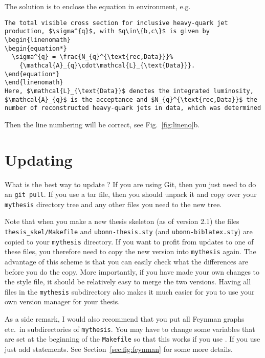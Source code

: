 The solution is to enclose the equation in  environment, e.g.
\begin{verbatim}
The total visible cross section for inclusive heavy-quark jet
production, $\sigma^{q}$, with $q\in\{b,c\}$ is given by
\begin{linenomath}
\begin{equation*}
  \sigma^{q} = \frac{N_{q}^{\text{rec,Data}}}%
    {\mathcal{A}_{q}\cdot\mathcal{L}_{\text{Data}}}.
\end{equation*}
\end{linenomath}
Here, $\mathcal{L}_{\text{Data}}$ denotes the integrated luminosity,
$\mathcal{A}_{q}$ is the acceptance and $N_{q}^{\text{rec,Data}}$ the
number of reconstructed heavy-quark jets in data, which was determined
\end{verbatim}
\noindent
Then the line numbering will be correct, see Fig.~\ref{fig:lineno}b.


\section{Updating }
\label{sec:tips:update}

What is the best way to update ? If you are
using Git, then you just need to do an \texttt{git pull}. If you use
a tar file, then you should unpack it and copy over your
\texttt{mythesis} directory tree and any other files you need to the new tree.

Note that when you make a new thesis skeleton (as of version 2.1) the files
\texttt{thesis\_skel/Makefile} and \texttt{ubonn-thesis.sty} 
(and \texttt{ubonn-biblatex.sty}) are copied
to your \texttt{mythesis} directory. If you want to profit from
updates to one of these files, you therefore need to copy the new
version into \texttt{mythesis} again. The advantage of this scheme is
that you can easily check what the differences are before you do the
copy. More importantly, if you have made your own changes to the style
file, it should be relatively easy to merge the two versions. Having
all files in the \texttt{mythesis} subdirectory also makes it much easier
for you to use your own version manager for your thesis.

As a side remark, I would also recommend that you put all Feynman
graphs etc.\ in subdirectories of \texttt{mythesis}. You may have to
change some variables that are set at the beginning of the
\texttt{Makefile} so that this works if you use . If
you use  just add  statements. See
Section~\ref{sec:fig:feynman} for some more details.


